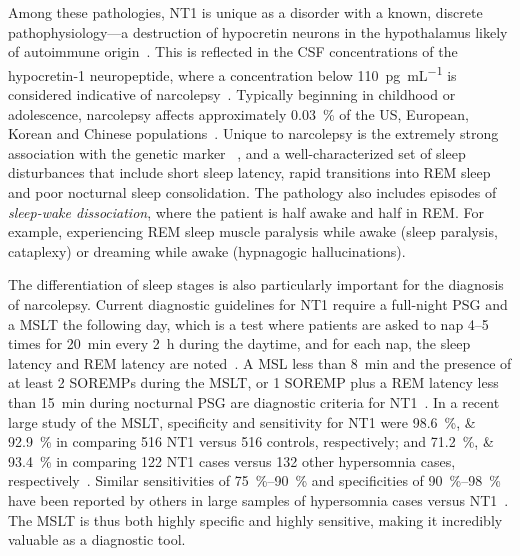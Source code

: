 Among these pathologies, \ac{NT1} is unique as a disorder with a known, discrete pathophysiology---a destruction of hypocretin neurons in the hypothalamus likely of autoimmune origin~\cite{Peyron2000}.
This is reflected in the \ac{CSF} concentrations of the hypocretin-1 neuropeptide, where a concentration below \SI{110}{\pico\gram\per\milli\liter} is considered indicative of narcolepsy~\cite{AmericanAcademyofSleepMedicine2014}.
Typically beginning in childhood or adolescence, narcolepsy affects approximately \SI{0.03}{\percent} of the US, European, Korean and Chinese populations~\cite{Kornum2017}.
Unique to narcolepsy is the extremely strong association with the genetic marker \hla~\cite{Han2014}, and a well-characterized set of sleep disturbances that include short sleep latency, rapid transitions into \ac{REM} sleep and poor nocturnal sleep consolidation.
The pathology also includes episodes of \textit{sleep-wake dissociation}, where the patient is half awake and half in \ac{REM}.
For example, experiencing REM sleep muscle paralysis while awake (sleep paralysis, cataplexy) or dreaming while awake (hypnagogic hallucinations).

The differentiation of sleep stages is also particularly important for the diagnosis of narcolepsy.
Current diagnostic guidelines for \ac{NT1} require a full-night \ac{PSG} and a \ac{MSLT} the following day, which is a test where patients are asked to nap \numrange{4}{5} times for \SI{20}{\minute} every \SI{2}{\hour} during the daytime, and for each nap, the sleep latency and \ac{REM} latency are noted~\cite{Littner2005}.
A \ac{MSL} less than \SI{8}{\minute} and the presence of at least \num{2} \acp{SOREMP} during the \ac{MSLT}, or \num{1} \ac{SOREMP} plus a \ac{REM} latency less than \SI{15}{\minute} during nocturnal \ac{PSG} are diagnostic criteria for \ac{NT1}~\cite{AmericanAcademyofSleepMedicine2014}.
In a recent large study of the \ac{MSLT}, specificity and sensitivity for \ac{NT1} were \SIlist{98.6;92.9}{\percent} in comparing \num{516} \ac{NT1} versus \num{516} controls, respectively; and \SIlist{71.2;93.4}{\percent} in comparing \num{122} \ac{NT1} cases versus \num{132} other hypersomnia cases, respectively~\cite{Andlauer2013}.
Similar sensitivities of \SIrange{75}{90}{\percent} and specificities of \SIrange{90}{98}{\percent} have been reported by others in large samples of hypersomnia cases versus \ac{NT1}~\cite{Mignot2002,Andlauer2012,Luca2013,Dauvilliers2004,Moscovitch1993}. 
The \ac{MSLT} is thus both highly specific and highly sensitive, making it incredibly valuable as a diagnostic tool. 

